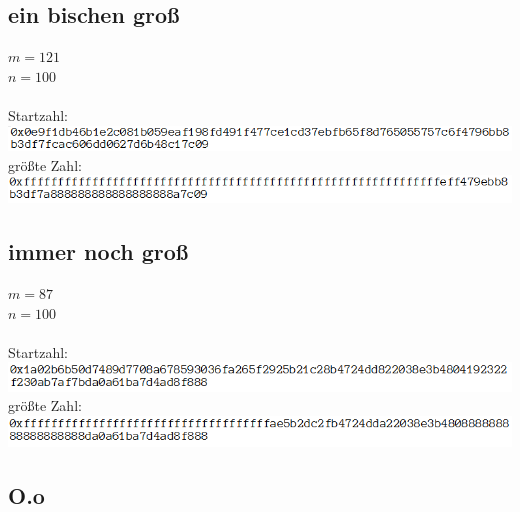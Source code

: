 \documentclass[a4paper,10pt,ngerman]{scrartcl}
\begin{document}
\subsection{ein bischen groß}

$m=121$
\\
$n=100$
\\
\\
Startzahl: 
\\
\includegraphics[width=\textwidth]{solutions/startzahl3.png} 
\\
größte Zahl:
\\
\includegraphics[width=\textwidth]{solutions/endzahl3.png} 

\subsection{immer noch groß}

$m=87$
\\
$n=100$
\\
\\
Startzahl: 
\\
\includegraphics[width=\textwidth]{solutions/startzahl4.png} 
\\
größte Zahl:
\\
\includegraphics[width=\textwidth]{solutions/endzahl4.png} 

\subsection{O.o}
\end{document}

